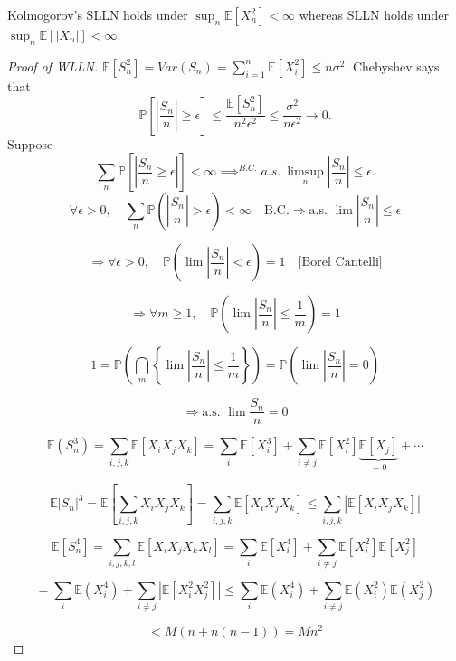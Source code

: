 \documentclass{article}
\newcommand{\1}{\mathds{1}}
\newcommand{\E}{\mathbb{E}}
\newcommand{\PB}{\mathbb{P}}
\newcommand{\lf}{\left}
\newcommand{\rg}{\right}
\newcommand{\f}[2]{\frac{#1}{#2}}
\newcommand{\tb}[1]{\lf[#1\rg]}
\newcommand{\card}[1]{\lf\vert #1\rg\vert}
\begin{document}
Kolmogorov's SLLN holds under $\sup_n\E[X_n^2]<\infty$ whereas SLLN holds under $\sup_n\E[\card{X_n}]<\infty.$ 
\begin{proof}[Proof of WLLN]
    $\E[S_n^2]=Var(S_n)=\sum_{i=1}^n\E[X_i^2]\leq n\sigma^2.$ Chebyshev says that $$\PB\tb{\card{\f {S_n}n}\geq\epsilon}\leq \f{\E[S_n^2]}{n^2\epsilon^2}\leq \f{\sigma^2}{n\epsilon^2}\to 0.$$ 
Suppose $$\sum_n\PB\tb{\card{\f{S_n}n\geq\epsilon}}<\infty\implies^{B.C.}a.s.\ \limsup_n\card{\f{S_n}n}\leq\epsilon.$$
\[
\forall \epsilon > 0, \quad \sum_n \mathbb{P}\left( \left| \frac{S_n}{n} \right| > \epsilon \right) < \infty 
\quad \text{B.C.} \Rightarrow \text{a.s. } \lim \left| \frac{S_n}{n} \right| \leq \epsilon
\]

\[
\Rightarrow \forall \epsilon > 0, \quad \mathbb{P} \left( \lim \left| \frac{S_n}{n} \right| < \epsilon \right) = 1 
\quad \text{[Borel Cantelli]}
\]

\[
\Rightarrow \forall m \geq 1, \quad \mathbb{P} \left( \lim \left| \frac{S_n}{n} \right| \leq \frac{1}{m} \right) = 1
\]

\[
1 = \mathbb{P} \left( \bigcap_m \left\{ \lim \left| \frac{S_n}{n} \right| \leq \frac{1}{m} \right\} \right) 
= \mathbb{P} \left( \lim \left| \frac{S_n}{n} \right| = 0 \right)
\]

\[
\Rightarrow \text{a.s. } \lim \frac{S_n}{n} = 0
\]

\[
\mathbb{E}(S_n^3) = \sum_{i,j,k} \mathbb{E}[X_i X_j X_k] = \sum_i \mathbb{E}[X_i^3] 
+ \sum_{i \neq j} \mathbb{E}[X_i^2] \underbrace{\mathbb{E}[X_j]}_{=0} + \cdots
\]

\[
\mathbb{E} \left| S_n \right|^3 = \mathbb{E} \left[ \sum_{i,j,k} X_i X_jX_k \right] 
= \sum_{i,j,k} \mathbb{E}[X_i X_j X_k] \leq \sum_{i,j,k} \left| \mathbb{E}[X_i X_j X_k] \right|
\]

\[
\mathbb{E} \left[ S_n^4 \right] = \sum_{i,j,k,l} \mathbb{E}[X_i X_j X_k X_l] 
= \sum_{i} \mathbb{E}[X_i^4] + \sum_{i \neq j} \mathbb{E}[X_i^2] \mathbb{E}[X_j^2]
\]

\[
= \sum_{i} \mathbb{E}(X_i^4) + \sum_{i \neq j} \left| \mathbb{E}[X_i^2 X_j^2] \right|
\leq \sum_i \mathbb{E}(X_i^4) + \sum_{i \neq j} \mathbb{E}(X_i^2) \mathbb{E}(X_j^2)
\]

\[
< M(n + n(n-1)) = Mn^2
\]
\end{proof}
\end{document}
